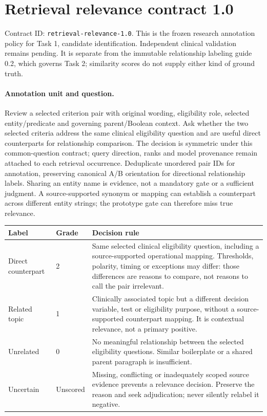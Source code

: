\documentclass[10pt,letterpaper]{article}
\newcommand{\pathcode}[1]{\nolinkurl{#1}}
\begin{document}
\section{Retrieval relevance contract 1.0}\label{sec:relevancecontract}
Contract ID: \pathcode{retrieval-relevance-1.0}. This is the frozen research
annotation policy for Task 1, candidate identification. Independent clinical
validation remains pending. It is separate from the immutable relationship
labeling guide 0.2, which governs Task 2; similarity scores do not supply either
kind of ground truth.

\paragraph{Annotation unit and question.}
Review a selected criterion pair with original wording, eligibility role,
selected entity/predicate and governing parent/Boolean context. Ask whether the
two selected criteria address the same clinical eligibility question and are
useful direct counterparts for relationship comparison. The decision is symmetric
under this common-question contract; query direction, ranks and model provenance
remain attached to each retrieval occurrence. Deduplicate unordered pair IDs
for annotation, preserving canonical A/B orientation for directional relationship
labels. Sharing an entity name is evidence, not a mandatory gate or a sufficient
judgment. A source-supported synonym or mapping can establish a counterpart
across different entity strings; the prototype gate can therefore miss true relevance.

\begin{longtable}{@{}p{}p{}p{}@{}}
\toprule Label & Grade & Decision rule\\\midrule
\endhead
Direct counterpart & 2 & Same selected clinical eligibility question, including a source-supported operational mapping. Thresholds, polarity, timing or exceptions may differ: those differences are reasons to compare, not reasons to call the pair irrelevant.\\
Related topic & 1 & Clinically associated topic but a different decision variable, test or eligibility purpose, without a source-supported counterpart mapping. It is contextual relevance, not a primary positive.\\
Unrelated & 0 & No meaningful relationship between the selected eligibility questions. Similar boilerplate or a shared parent paragraph is insufficient.\\
Uncertain & Unscored & Missing, conflicting or inadequately scoped source evidence prevents a relevance decision. Preserve the reason and seek adjudication; never silently relabel it negative.\\\bottomrule
\end{longtable}
\end{document}
